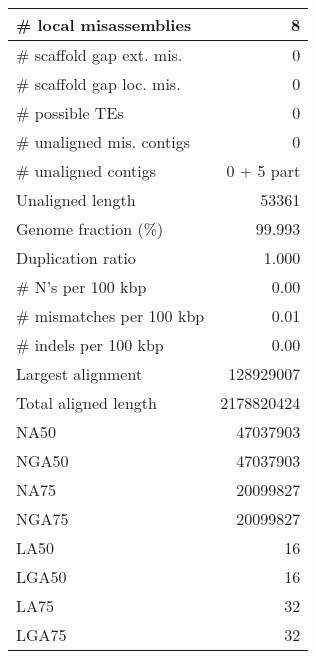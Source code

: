 \documentclass[12pt,a4paper]{article}
\begin{document}
\begin{table}[ht]
\begin{center}
\begin{tabular}{|l*{1}{|r}|}
\# local misassemblies & 8 \\ \hline
\# scaffold gap ext. mis. & 0 \\ \hline
\# scaffold gap loc. mis. & 0 \\ \hline
\# possible TEs & 0 \\ \hline
\# unaligned mis. contigs & 0 \\ \hline
\# unaligned contigs & 0 + 5 part \\ \hline
Unaligned length & 53361 \\ \hline
Genome fraction (\%) & 99.993 \\ \hline
Duplication ratio & 1.000 \\ \hline
\# N's per 100 kbp & 0.00 \\ \hline
\# mismatches per 100 kbp & 0.01 \\ \hline
\# indels per 100 kbp & 0.00 \\ \hline
Largest alignment & 128929007 \\ \hline
Total aligned length & 2178820424 \\ \hline
NA50 & 47037903 \\ \hline
NGA50 & 47037903 \\ \hline
NA75 & 20099827 \\ \hline
NGA75 & 20099827 \\ \hline
LA50 & 16 \\ \hline
LGA50 & 16 \\ \hline
LA75 & 32 \\ \hline
LGA75 & 32 \\ \hline
\end{tabular}
\end{center}
\end{table}
\end{document}
